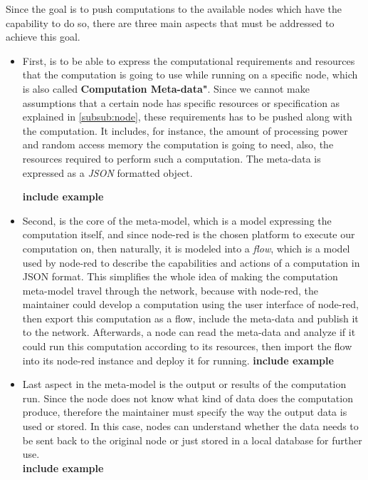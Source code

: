 Since the goal is to push computations to the available nodes which have the capability to do so, there are three main aspects that must be addressed to achieve this goal.
\begin{itemize}
	
	\item First, is to be able to express the computational requirements and resources that the computation is going to use while running on a specific node, which is also called \textbf{Computation Meta-data"}. Since we cannot make assumptions that a certain node has specific resources or specification as explained in \ref{subsub:node}, these requirements has to be pushed along with the computation. It includes, for instance, the amount of processing power and random access memory the computation is going to need, also, the resources required to perform such a computation.
	The meta-data is expressed as a \textit{JSON} formatted object.
	
	\textbf{include example}
	
	\item Second, is the core of the meta-model, which is a model expressing the computation itself, and since node-red is the chosen platform to execute our computation on, then naturally, it is modeled into a \textit{flow}, which is a model used by node-red to describe the capabilities and actions of a computation in JSON format. This simplifies the whole idea of making the computation meta-model travel through the network, because with node-red, the maintainer could develop a computation using the user interface of node-red, then export this computation as a flow, include the meta-data and publish it to the network. Afterwards, a node can read the meta-data and analyze if it could run this computation according to its resources, then import the flow into its node-red instance and deploy it for running.
	\textbf{include example}
	
	\item Last aspect in the meta-model is the output or results of the computation run. Since the node does not know what kind of data does the computation produce, therefore the maintainer must specify the way the output data is used or stored. In this case, nodes can understand whether the data needs to be sent back to the original node or just stored in a local database for further use. \\
	\textbf{include example}
\end{itemize}

